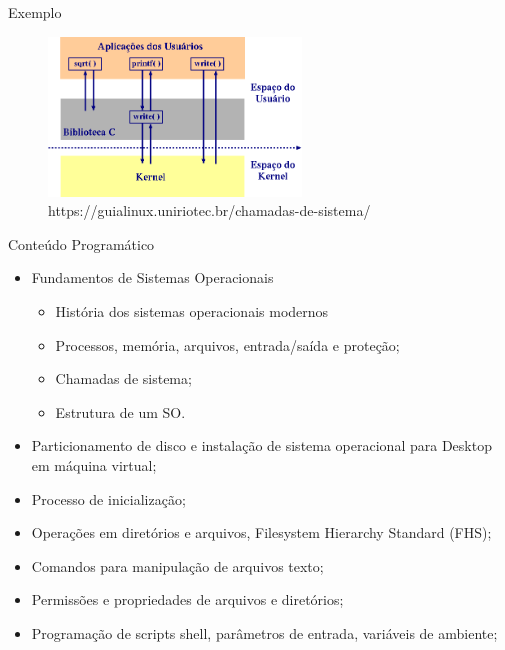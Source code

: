 \documentclass{beamer}
\begin{document}
\begin{frame}{Exemplo}\justifying
      \begin{figure}[H]
            \centerline{\includegraphics[width=0.6\textwidth]{assets/aula-tads-sopa2-2023-06-05/chamadas.png}}
            \caption{https://guialinux.uniriotec.br/chamadas-de-sistema/}
        \end{figure}
\end{frame}

\begin{frame}[fragile]{Conteúdo Programático}

\begin{itemize}
      \item Fundamentos de Sistemas Operacionais
      \begin{itemize}
            \item História dos sistemas operacionais modernos
            \item Processos, memória, arquivos, entrada/saída e proteção;
            \item Chamadas de sistema;
            \item Estrutura de um SO.
      \end{itemize}
      \item Particionamento de disco e instalação de sistema operacional para Desktop em
      máquina virtual;
      \item Processo de inicialização;
      \item Operações em diretórios e arquivos, Filesystem Hierarchy Standard (FHS);
      \item Comandos para manipulação de arquivos texto;
      \item Permissões e propriedades de arquivos e diretórios;
      \item Programação de scripts shell, parâmetros de entrada, variáveis de ambiente;
    
\end{itemize}
\end{frame}
\end{document}
